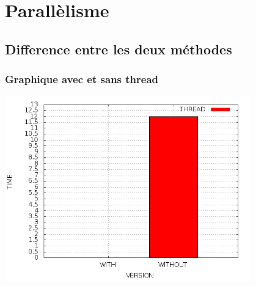 \documentclass{beamer}
\begin{document}
\section{Parall\`elisme}
\subsection{Difference entre les deux m\'ethodes}
\begin{frame}
  \frametitle{Graphique avec et sans thread}
  \begin{center}
    \includegraphics[width=0.8\textwidth]{thread.png}
  \end{center}
\end{frame}
\end{document}
